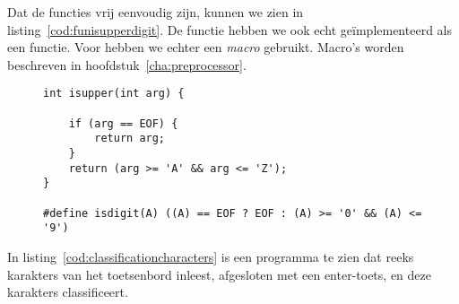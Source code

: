 Dat de functies vrij eenvoudig zijn, kunnen we zien in listing~\ref{cod:funisupperdigit}. De functie  hebben we ook echt geïmplementeerd als een functie. Voor  hebben we echter een \textsl{macro} gebruikt. Macro's worden beschreven in hoofdstuk~\ref{cha:preprocessor}.

\begin{figure}[!ht]
\begin{lstlisting}[caption=Implementatie van de functies \texttt{isupper()} en \texttt{isdigit()}.,label=cod:funisupperdigit]
int isupper(int arg) {

	if (arg == EOF) {
		return arg;
	}
	return (arg >= 'A' && arg <= 'Z');
}

#define isdigit(A) ((A) == EOF ? EOF : (A) >= '0' && (A) <= '9')
\end{lstlisting}
\end{figure}

In listing~\ref{cod:classificationcharacters} is een programma te zien dat reeks karakters van het toetsenbord inleest, afgesloten met een enter-toets, en deze karakters classificeert.

